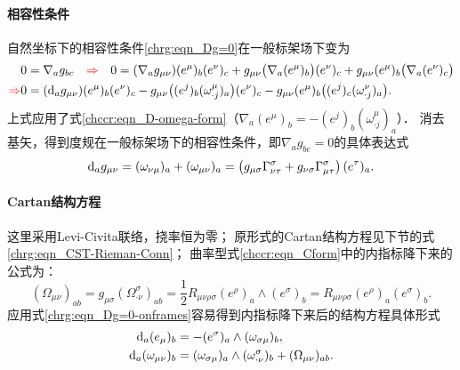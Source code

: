 \paragraph{相容性条件}
自然坐标下的相容性条件\eqref{chrg:eqn_Dg=0}在一般标架场下变为
\setlength{\mathindent}{0em}
\begin{align*}
    &0=\nabla_a g_{bc} \quad {\color{red}\Rightarrow}\quad 0=
    (\nabla_a g_{\mu\nu}) (e^\mu)_b (e^\nu)_c
    +g_{\mu\nu} \bigl(\nabla_a (e^\mu)_b\bigr) (e^\nu)_c
    +g_{\mu\nu}(e^\mu)_b \bigl(\nabla_a (e^\nu)_c \bigr) \\
    {\color{red}\Rightarrow} &0=
    ({\rm d}_a g_{\mu\nu}) (e^\mu)_b (e^\nu)_c
    -g_{\mu\nu} \bigl( (e^j)_b (\omega_{\cdot j}^{\mu})_a \bigr) (e^\nu)_c
    -g_{\mu\nu}(e^\mu)_b \bigl((e^j)_c (\omega_{\cdot j}^{\nu})_a \bigr) .
\end{align*}\setlength{\mathindent}{2em}
上式应用了式\eqref{chccr:eqn_D-omega-form}（$\nabla _a (e^\mu)_b=- (e^j)_b (\omega_{\cdot j}^{\mu})_a$）．
消去基矢，得到度规在一般标架场下的相容性条件，即$\nabla_a g_{bc}=0$的具体表达式
\begin{equation}\label{chrg:eqn_Dg=0-onframes}
    {\rm d}_a g_{\mu\nu} 
     = (\omega_{\nu \mu})_a + (\omega_{\mu \nu})_a
     = \left(g_{\mu\sigma}\Gamma^{\sigma}_{\nu\tau}
      + g_{\nu\sigma}\Gamma^{\sigma}_{\mu\tau}\right) (e^\tau)_a .
\end{equation}

\paragraph{Cartan结构方程}
这里采用Levi-Civita联络，挠率恒为零；
原形式的Cartan结构方程见下节的式\eqref{chrg:eqn_CST-Rieman-Conn}；
曲率型式\eqref{chccr:eqn_Cform}中的内指标降下来的公式为：
\begin{equation}\label{chrg:eqn_Cform-down}
    (\Omega_{\mu\nu} )_{ab} 
    = g_{\mu\sigma}(\Omega_{\cdot \nu} ^{\sigma})_{ab}
    = \frac{1}{2} R_{\mu \nu \rho\sigma}  (e^\rho)_a \wedge (e^\sigma)_b
    = R_{\mu \nu \rho\sigma} (e^\rho)_a (e^\sigma)_b .
\end{equation}
应用式\eqref{chrg:eqn_Dg=0-onframes}容易得到内指标降下来后的结构方程具体形式
\begin{subequations}\label{chrg:eqn_CST-down}
    \begin{align}
        {\rm d}_a (e_\mu)_b &=- (e^\sigma)_a \wedge (\omega_{\sigma \mu})_b  , \label{chrg:eqn_CST-down-I} \\
        {\rm d}_a (\omega _{\mu\nu})_b  &= (\omega_{\sigma \mu})_a \wedge (\omega _{\cdot \nu} ^\sigma  )_b
          + (\Omega_{\mu \nu})_{ab}  . \label{chrg:eqn_CST-down-II}
    \end{align}
\end{subequations}

